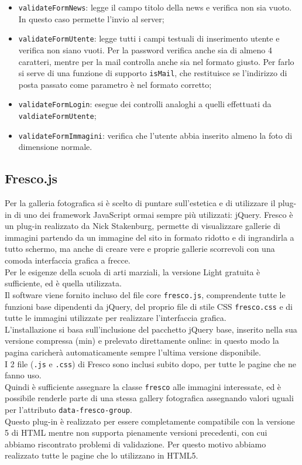 \begin{itemize}
\item \texttt{validateFormNews}: legge il campo titolo della news e verifica non sia vuoto. In questo caso permette l’invio al server;
\item \texttt{validateFormUtente}: legge tutti i campi testuali di inserimento utente e verifica non siano vuoti. Per la password verifica anche sia di almeno 4 caratteri, mentre per la mail controlla anche sia nel formato giusto. Per farlo si serve di una funzione di supporto \texttt{isMail}, che restituisce se l'indirizzo di posta passato come parametro è nel formato corretto;
\item \texttt{validateFormLogin}: esegue dei controlli analoghi a quelli effettuati da \texttt{valdiateFormUtente};
\item \texttt{validateFormImmagini}: verifica che l'utente abbia inserito almeno la foto di dimensione normale.  
\end{itemize}

\subsection{Fresco.js}\label{fresco}

Per la galleria fotografica si è scelto di puntare sull'estetica e di utilizzare il plug-in di uno dei framework JavaScript ormai sempre più utilizzati: jQuery.
Fresco è un plug-in realizzato da Nick Stakenburg, permette di visualizzare gallerie di immagini partendo da un immagine del sito in formato ridotto e di ingrandirla a tutto schermo, ma anche di creare vere e proprie gallerie scorrevoli con una comoda interfaccia grafica a frecce. \\
Per le esigenze della scuola di arti marziali, la versione Light gratuita è sufficiente, ed è quella utilizzata.\\ 
Il software viene fornito incluso del file core \texttt{fresco.js}, comprendente tutte le funzioni base dipendenti da jQuery, del proprio file di stile CSS \texttt{fresco.css} e di tutte le immagini utilizzate per realizzare l'interfaccia grafica.\\
L'installazione si basa sull'inclusione del pacchetto jQuery base, inserito nella sua versione compressa (min) e prelevato direttamente online: in questo modo la pagina caricherà automaticamente sempre l'ultima versione disponibile.\\
I 2 file (\texttt{.js} e \texttt{.css}) di Fresco sono inclusi subito dopo, per tutte le pagine che ne fanno uso.\\
Quindi è sufficiente assegnare la classe \texttt{fresco} alle immagini interessate, ed è possibile renderle parte di una stessa gallery fotografica assegnando valori uguali per l'attributo \texttt{data-fresco-group}.\\
Questo plug-in è realizzato per essere completamente compatibile con la versione 5 di HTML mentre non supporta pienamente versioni precedenti, con cui abbiamo riscontrato problemi di validazione.
Per questo motivo abbiamo realizzato tutte le pagine che lo utilizzano in HTML5.

